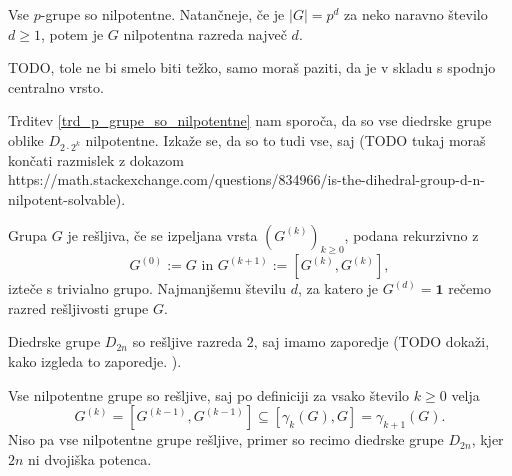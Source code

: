 \begin{trditev}
\label{trd_p_grupe_so_nilpotentne}
    Vse $p$-grupe so nilpotentne. Natančneje, če je $\lvert G \rvert  = p^{d}$ za neko naravno število $d \ge 1$, potem je $G$ nilpotentna razreda največ $d$. 
\end{trditev}
\begin{dokaz}
    TODO, tole ne bi smelo biti težko, samo moraš paziti, da je v skladu s spodnjo centralno vrsto.
\end{dokaz}

\begin{primer}
Trditev \ref{trd_p_grupe_so_nilpotentne} nam sporoča, da so vse diedrske grupe oblike $D_{2 \cdot 2^{k}}$ nilpotentne. Izkaže se, da so to tudi vse, saj (TODO tukaj moraš končati razmislek z dokazom https://math.stackexchange.com/questions/834966/is-the-dihedral-group-d-n-nilpotent-solvable). 
\end{primer}

\begin{definicija}
    \label{def_resljiva_grupa}
    Grupa $G$ je rešljiva, če se izpeljana vrsta $(G^{(k)})_{k \ge 0}$, podana rekurzivno z \begin{equation*}
        G^{(0)} := G \text{ in } G^{(k + 1)} := [G^{(k)}, G^{(k)}],
        \end{equation*}  
        izteče s trivialno grupo. Najmanjšemu številu $d$, za katero je $G^{(d)} = \mathbf{1}$ rečemo razred rešljivosti grupe $G$.    
    \end{definicija}
    
    \begin{primer}
    Diedrske grupe $D_{2n}$ so rešljive razreda $2$, saj imamo zaporedje (TODO dokaži, kako izgleda to zaporedje. ).  %
    \end{primer}
    
    \begin{primer}
        Vse nilpotentne grupe so rešljive, saj po definiciji za vsako število $k \ge 0$ velja \begin{equation*}
        G^{(k)} = [G^{(k-1)}, G^{(k-1)}] \subseteq  [\gamma_k(G), G] = \gamma_{k +1}(G).
        \end{equation*}
        Niso pa vse nilpotentne grupe rešljive, primer so recimo diedrske grupe $D_{2n}$, kjer $2n$ ni dvojiška potenca. 
    \end{primer}
    

